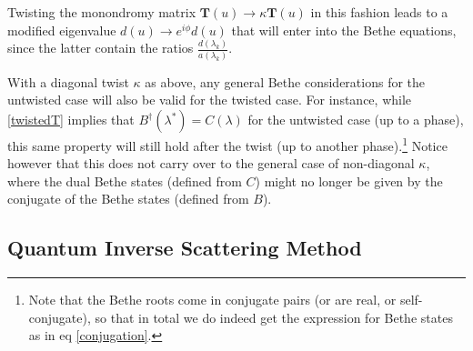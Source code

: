 \documentclass[a4paper,10pt]{article}
\newcommand{\linnea}[1]{$\framebox{\tiny L}$\ \textbf{\texttt{{\color{red}\footnotesize#1}}}}
\newcommand{\jesper}[1]{$\framebox{\tiny J}$\ \textbf{\texttt{{\color{cyan}\footnotesize#1}}}}
\begin{document}
Twisting the monondromy matrix $\mathbf{T}(u)\rightarrow\kappa\mathbf{T}(u)$ in this fashion leads to a modified eigenvalue $d(u) \rightarrow e^{i\phi } d(u)$ that will enter into the Bethe equations, since the latter contain the ratios $\frac{d(\lambda_k)}{a(\lambda_k)}$. 


With a diagonal twist $\kappa$ as above, any general Bethe considerations for the untwisted case will also be valid for the twisted case.
For instance, while \eqref{twistedT} implies that $B^\dagger(\lambda^*) = C(\lambda)$ for the untwisted case (up to a phase), this same property will still hold after the twist (up to another phase).\footnote{Note that the Bethe roots come in conjugate pairs (or are real, or self-conjugate), so that in total we do indeed get the expression for Bethe states as in eq \eqref{conjugation}.} 
Notice however that this does not carry over to the general case of non-diagonal $\kappa$, where the dual Bethe states (defined from $C$) might no longer be given by the conjugate of the Bethe states (defined from $B$).






\subsection{Quantum Inverse Scattering Method}
\end{document}
